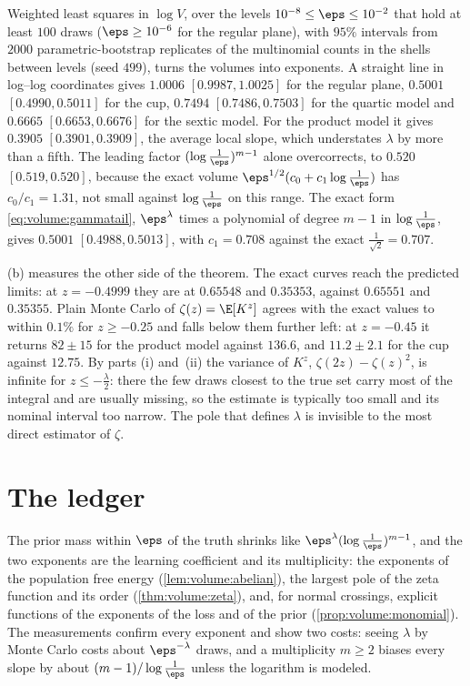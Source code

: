 \begin{refsection}
Weighted least squares in $\log V$, over the levels $10^{-8}\le\eps\le10^{-2}$ that hold at least $100$ draws ($\eps\ge10^{-6}$ for the regular plane), with $95\%$ intervals from $2000$ parametric-bootstrap replicates of the multinomial counts in the shells between levels (seed $499$), turns the volumes into exponents. A straight line in log--log coordinates gives $1.0006$ $[0.9987,1.0025]$ for the regular plane, $0.5001$ $[0.4990,0.5011]$ for the cup, $0.7494$ $[0.7486,0.7503]$ for the quartic model and $0.6665$ $[0.6653,0.6676]$ for the sextic model. For the product model it gives $0.3905$ $[0.3901,0.3909]$, the average local slope, which understates $\lambda$ by more than a fifth. The leading factor $(\log\frac1\eps)^{m-1}$ alone overcorrects, to $0.520$ $[0.519,0.520]$, because the exact volume $\eps^{1/2}(c_0+c_1\log\frac1\eps)$ has $c_0/c_1=1.31$, not small against $\log\frac1\eps$ on this range. The exact form \eqref{eq:volume:gammatail}, $\eps^\lambda$ times a polynomial of degree $m-1$ in $\log\frac1\eps$, gives $0.5001$ $[0.4988,0.5013]$, with $c_1=0.708$ against the exact $\frac1{\sqrt2}=0.707$.

(b) measures the other side of the theorem. The exact curves reach the predicted limits: at $z=-0.4999$ they are at $0.65548$ and $0.35353$, against $0.65551$ and $0.35355$. Plain Monte Carlo of $\zeta(z)=\E[K^z]$ agrees with the exact values to within $0.1\%$ for $z\ge-0.25$ and falls below them further left: at $z=-0.45$ it returns $82\pm15$ for the product model against $136.6$, and $11.2\pm2.1$ for the cup against $12.75$. By parts (i) and~(ii) the variance of $K^z$, $\zeta(2z)-\zeta(z)^2$, is infinite for $z\le-\frac\lambda2$: there the few draws closest to the true set carry most of the integral and are usually missing, so the estimate is typically too small and its nominal interval too narrow. The pole that defines $\lambda$ is invisible to the most direct estimator of $\zeta$.

\section{The ledger}\label{sec:volume:ledger}

The prior mass within $\eps$ of the truth shrinks like $\eps^\lambda(\log\frac1\eps)^{m-1}$, and the two exponents are the learning coefficient and its multiplicity: the exponents of the population free energy (\cref{lem:volume:abelian}), the largest pole of the zeta function and its order (\cref{thm:volume:zeta}), and, for normal crossings, explicit functions of the exponents of the loss and of the prior (\cref{prop:volume:monomial}). The measurements confirm every exponent and show two costs: seeing $\lambda$ by Monte Carlo costs about $\eps^{-\lambda}$ draws, and a multiplicity $m\ge2$ biases every slope by about $(m-1)/\log\frac1\eps$ unless the logarithm is modeled.


\end{refsection}
